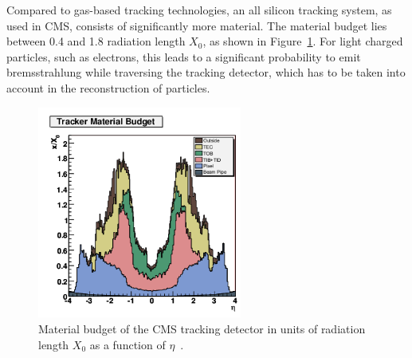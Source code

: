 Compared to gas-based tracking technologies, an all silicon tracking system, as used in CMS, consists of significantly more material. The material budget lies between 0.4 and 1.8 radiation length $X_0$, as shown in Figure~\ref{fig:trackerMaterial}. For light charged particles, such as electrons, this leads to a significant probability to emit bremsstrahlung while traversing the tracking detector, which has to be taken into account in the reconstruction of particles.    
\begin{figure}[htbp]
\centering
  \includegraphics[width=0.6\textwidth]{plots/CMS/TrackerMaterial.png}
\caption{Material budget of the CMS tracking detector in units of radiation length $X_0$ as a function of $\eta$~\cite{CMS}.}
\label{fig:trackerMaterial}
\end{figure} 
